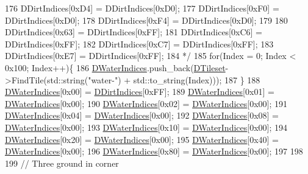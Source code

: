 \begin{DoxyCode}
176 \textcolor{comment}{    DDirtIndices[0xD4] = DDirtIndices[0xD0];}
177 \textcolor{comment}{    DDirtIndices[0xF0] = DDirtIndices[0xD0];}
178 \textcolor{comment}{    DDirtIndices[0xF4] = DDirtIndices[0xD0];}
179 \textcolor{comment}{    }
180 \textcolor{comment}{    DDirtIndices[0x63] = DDirtIndices[0xFF];}
181 \textcolor{comment}{    DDirtIndices[0xC6] = DDirtIndices[0xFF];}
182 \textcolor{comment}{    DDirtIndices[0xC7] = DDirtIndices[0xFF];}
183 \textcolor{comment}{    DDirtIndices[0xE7] = DDirtIndices[0xFF];}
184 \textcolor{comment}{    */}
185     \textcolor{keywordflow}{for}(Index = 0; Index < 0x100; Index++)\{
186         \hyperlink{classCMapRenderer_af82295ac61f841481490da6f2b433db2}{DWaterIndices}.push\_back(\hyperlink{classCMapRenderer_ace0648cba050b5e02431096edd15b836}{DTileset}->FindTile(std::string(\textcolor{stringliteral}{"water-"}) + 
      std::to\_string(Index)));
187     \}
188     \hyperlink{classCMapRenderer_af82295ac61f841481490da6f2b433db2}{DWaterIndices}[0x00] = \hyperlink{classCMapRenderer_a5916c26aa5bedf8367a8f3f7efb457bf}{DDirtIndices}[0xFF];
189     \hyperlink{classCMapRenderer_af82295ac61f841481490da6f2b433db2}{DWaterIndices}[0x01] = \hyperlink{classCMapRenderer_af82295ac61f841481490da6f2b433db2}{DWaterIndices}[0x00];
190     \hyperlink{classCMapRenderer_af82295ac61f841481490da6f2b433db2}{DWaterIndices}[0x02] = \hyperlink{classCMapRenderer_af82295ac61f841481490da6f2b433db2}{DWaterIndices}[0x00];
191     \hyperlink{classCMapRenderer_af82295ac61f841481490da6f2b433db2}{DWaterIndices}[0x04] = \hyperlink{classCMapRenderer_af82295ac61f841481490da6f2b433db2}{DWaterIndices}[0x00];
192     \hyperlink{classCMapRenderer_af82295ac61f841481490da6f2b433db2}{DWaterIndices}[0x08] = \hyperlink{classCMapRenderer_af82295ac61f841481490da6f2b433db2}{DWaterIndices}[0x00];
193     \hyperlink{classCMapRenderer_af82295ac61f841481490da6f2b433db2}{DWaterIndices}[0x10] = \hyperlink{classCMapRenderer_af82295ac61f841481490da6f2b433db2}{DWaterIndices}[0x00];
194     \hyperlink{classCMapRenderer_af82295ac61f841481490da6f2b433db2}{DWaterIndices}[0x20] = \hyperlink{classCMapRenderer_af82295ac61f841481490da6f2b433db2}{DWaterIndices}[0x00];
195     \hyperlink{classCMapRenderer_af82295ac61f841481490da6f2b433db2}{DWaterIndices}[0x40] = \hyperlink{classCMapRenderer_af82295ac61f841481490da6f2b433db2}{DWaterIndices}[0x00];
196     \hyperlink{classCMapRenderer_af82295ac61f841481490da6f2b433db2}{DWaterIndices}[0x80] = \hyperlink{classCMapRenderer_af82295ac61f841481490da6f2b433db2}{DWaterIndices}[0x00];
197     
198     
199     \textcolor{comment}{// Three ground in corner}

\end{DoxyCode}
